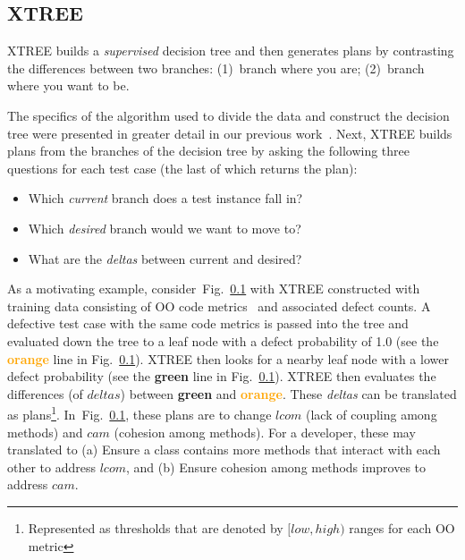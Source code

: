 \documentclass[sigconf, proceedings, 9pt]{acmart}
\newcommand{\fig}[1]{Fig.~\ref{sect:#1}}
\begin{document}

\subsection{XTREE}
\label{sect:xtree}
XTREE builds a {\em supervised} decision tree and then generates
plans by contrasting the differences between two branches:
(1)~branch where you are; (2)~branch where you want to be.

The specifics of the algorithm used to divide the data and construct the 
decision tree were presented in greater detail in our previous 
work~\cite{krishna17a}.
Next, XTREE builds plans from the branches of the decision tree by asking the 
following three questions for each test case (the last of which returns the 
plan):
\begin{itemize}[noitemsep,topsep=0pt]
\item Which {\em current} branch does a test instance fall in?
\item Which {\em desired} branch would we want to move to?
\item What are the {\em deltas} between current and desired? 
\end{itemize}


As a motivating example, consider~\fig{xtree} with XTREE constructed with 
training data consisting of OO code metrics~\cite{ck} and associated defect 
counts. 
A defective test case with the same code metrics is passed into the 
tree and evaluated down the tree to a leaf node with a defect probability of 
1.0 (see the \textcolor{orange}{{\bf orange}} line in \fig{xtree}).
XTREE then looks for a nearby leaf node with a lower defect
probability (see the \textcolor{Code}{\textbf{green}} line in \fig{xtree}). 
XTREE 
then evaluates the differences (of $deltas$) between
\textcolor{Code}{\textbf{green}} and \textcolor{orange}{{\bf orange}}.
These \textit{deltas} can be translated as plans\footnote{Represented as 
thresholds that are denoted by $[low,high)$ ranges for each OO metric}. 
In~\fig{xtree}, these plans are to change $lcom$ (lack of coupling among 
methods) and $cam$ (cohesion among methods). For a developer, these may 
translated to (a) Ensure a class contains more methods that interact with each 
other to address $lcom$, and (b) Ensure cohesion among methods improves to 
address $cam$. 



\end{document}

